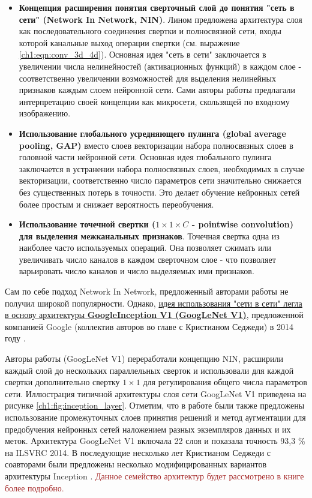\documentclass[12pt]{article}
\begin{document}
\begin{sloppypar}
\begin{itemize}
    \item \textbf{Концепция расширения понятия сверточный слой до понятия "сеть в сети" (Network In Network, NIN)}. Лином предложена архитектура слоя как последовательного соединения свертки и полносвязной сети, входы которой канальные выход операции свертки (см. выражение \ref{ch1:eqn:conv_3d_4d}). Основная идея "сеть в сети" заключается в увеличении числа нелинейностей (активационных функций) в каждом слое - соответственно увеличении возможностей для выделения нелинейных признаков каждым слоем нейронной сети. Сами авторы работы предлагали интерпретацию своей концепции как микросети, скользящей по входному изображению.
    
    \item \textbf{Использование глобального усредняющего пулинга (global average pooling, GAP)} вместо слоев векторизации набора полносвязных слоев в головной части нейронной сети. Основная идея глобального пулинга заключается в устранении набора полносвязных слоев, необходимых в случае векторизации, соответственно число параметров сети значительно снижается без существенных потерь в точности. Это делает обучение нейронных сетей более простым и снижает вероятность переобучения.
    
    \item \textbf{Использование точечной свертки ($1\times 1\times C$ - pointwise convolution) для выделения межканальных признаков}. Точечная свертка одна из наиболее часто используемых операций. Она позволяет сжимать или увеличивать число каналов в каждом сверточном слое - что позволяет варьировать число каналов и число выделяемых ими признаков.
    
\end{itemize}

Сам по себе подход Network In Network, предложенный авторами работы \cite{lin2013network} не получил широкой популярности. Однако, \uline{идея использования "сети в сети" легла в основу архитектуры\textbf{ GoogleInception V1 (GoogLeNet V1)}}, предложенной компанией Google (коллектив авторов во главе с Кристианом Седжеди) в 2014 году \cite{szegedy2015going}. 

Авторы работы \cite{szegedy2015going}(GoogLeNet V1) переработали концепцию NIN, расширили каждый слой до нескольких параллельных сверток и использовали для каждой свертки дополнительно свертку $1\times 1$ для регулирования общего числа параметров сети. Иллюстрация типичной архитектуры слоя сети GoogLeNet V1 приведена на рисунке \ref{ch1:fig:inception_layer}. Отметим, что в работе \cite{szegedy2015going} были также предложены использование промежуточных слоев принятия решений и метод аугментации для предобучения нейронных сетей наложением разных экземпляров данных  и их меток. Архитектура GoogLeNet V1 включала 22 слоя и показала точность 93,3 \% на ILSVRC 2014. В последующие несколько лет Кристианом Седжеди с соавторами были предложены несколько модифицированных вариантов архитектуры Inception \cite{szegedy2016rethinking, szegedy2017inception}. \textcolor{brown}{Данное семейство архитектур будет рассмотрено в книге более подробно.}


\end{sloppypar}
\end{document}
